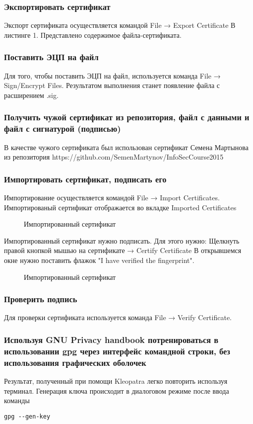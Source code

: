 \documentclass[10pt,a4paper]{article}
\begin{document}
\subsubsection{Экспортировать сертификат}
Экспорт сертификата осуществляется командой File → Export Certificate В листинге 1. Представлено содержимое файла-сертификата.

\subsubsection{Поставить ЭЦП на файл}
Для того, чтобы поставить ЭЦП на файл, используется команда File → Sign/Encrypt Files. Результатом выполнения станет появление файла с расширением .sig.
\subsubsection{Получить чужой сертификат из репозитория, файл с данными и файл с сигнатурой (подписью)}
В качестве чужого сертификата был использован сертификат Семена Мартынова из репозитория  https://github.com/SemenMartynov/InfoSecCourse2015
\subsubsection{Импортировать сертификат, подписать его}
Импортирование осуществляется командой File → Import Certificates. Импортированый сертификат отображается во вкладке Imported Certificates
\begin{figure}[h!]
\centering

\caption{Импортированный сертификат}
\end{figure}
Импортированный сертификат нужно подписать. Для этого нужно: Щелкнуть правой кнопкой мышью на сертификате  →  Certify Certificate
В открывшемся окне нужно поставить флажок "I have verified the fingerprint".
\begin{figure}[h!]
\centering

\caption{Импортированный сертификат}
\end{figure}
\subsubsection{Проверить подпись}
Для проверки сертификата используется команда File → Verify Certificate.
\subsubsection{Используя GNU Privacy handbook потренироваться в использовании gpg через интерфейс командной строки, без использования графических оболочек}
Результат, полученный при помощи Kleopatra легко повторить используя терминал. Генерация ключа происходит в диалоговом режиме после ввода команды
\begin{verbatim}gpg --gen-key
\end{verbatim}
\end{document}
